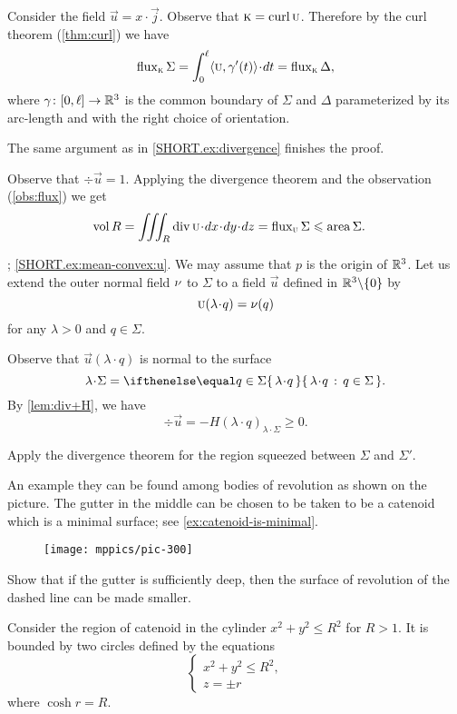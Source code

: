  Consider the field $\vec u=x\cdot\vec j$.
Observe that $\textsc k=\mathop{\rm curl}\nolimits \textsc u$.
Therefore by the curl theorem (\ref{thm:curl}) we have 
\[\flux_{\vec k}\Sigma=\int_0^\ell\langle\vec u,\gamma'(t)\rangle\cdot dt=\flux_{\vec k}\Delta,\]
where $\gamma\colon[0,\ell]\to\mathbb{R}^3$ is the common boundary of $\Sigma$ and $\Delta$ parameterized by its arc-length and with the right choice of orientation.

The same argument as in \ref{SHORT.ex:divergence} finishes the proof.



Observe that $\div\vec u=1$.
Applying the divergence theorem and the observation (\ref{obs:flux}) we get
\begin{align*}
\vol R&=\iiint_R\div\vec u\cdot dx\cdot dy\cdot dz
=
\flux_{\vec u}\Sigma
\le
\area\Sigma.
\end{align*}




\parbf{\ref{ex:mean-convex}}; \ref{SHORT.ex:mean-convex:u}.
We may assume that $p$ is the origin of $\mathbb{R}^3$.
Let us extend the outer normal field $\nu$ to $\Sigma$ to a field $\vec u$ defined in $\mathbb{R}^3\backslash\{0\}$ by
\[\vec u(\lambda\cdot q)=\Norm(q)\]
for any $\lambda>0$ and $q\in\Sigma$.

Observe that $\vec u(\lambda\cdot q)$ is normal to the surface 
\[\lambda\cdot\Sigma=\set{\lambda\cdot q}{q\in\Sigma}.\]
By \ref{lem:div+H}, we have
\[\div \vec u=-H(\lambda\cdot q)_{\lambda\cdot\Sigma}\ge 0.\]

 Apply the divergence theorem for the region squeezed between $\Sigma$ and $\Sigma'$.

An example they can be found among bodies of revolution as shown on the picture.
The gutter in the middle can be chosen to be taken to be a catenoid which is a minimal surface; see \ref{ex:catenoid-is-minimal}.
\begin{figure}[h!]
\vskip-0mm
\centering
\texttt{[image: mppics/pic-300]}
\vskip0mm
\end{figure}
Show that if the gutter is sufficiently deep, then the surface of revolution of the dashed line can be made smaller.


Consider the region of catenoid in the cylinder $x^2+y^2\le R^2$ for $R>1$.
It is bounded by two circles defined by the equations 
\[
\begin{cases}
x^2+y^2\le R^2,
\\
z=\pm r
\end{cases}
\]
where $\cosh r=R$.

